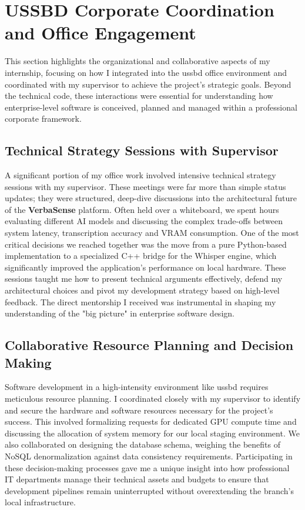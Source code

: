 \documentclass[oneside]{thesis-library}
\begin{document}
\section{USSBD Corporate Coordination and Office Engagement}
This section highlights the organizational and collaborative aspects of my internship, focusing on how I integrated into the \Gls{ussbd} office environment and coordinated with my supervisor to achieve the project's strategic goals. Beyond the technical code, these interactions were essential for understanding how enterprise-level software is conceived, planned and managed within a professional corporate framework.

\subsection{Technical Strategy Sessions with Supervisor}
A significant portion of my office work involved intensive technical strategy sessions with my supervisor. These meetings were far more than simple status updates; they were structured, deep-dive discussions into the architectural future of the \textbf{VerbaSense} platform. Often held over a whiteboard, we spent hours evaluating different AI models and discussing the complex trade-offs between system latency, transcription accuracy and VRAM consumption. One of the most critical decisions we reached together was the move from a pure Python-based implementation to a specialized C++ bridge for the Whisper engine, which significantly improved the application's performance on local hardware. These sessions taught me how to present technical arguments effectively, defend my architectural choices and pivot my development strategy based on high-level feedback. The direct mentorship I received was instrumental in shaping my understanding of the "big picture" in enterprise software design.

\subsection{Collaborative Resource Planning and Decision Making}
Software development in a high-intensity environment like \Gls{ussbd} requires meticulous resource planning. I coordinated closely with my supervisor to identify and secure the hardware and software resources necessary for the project's success. This involved formalizing requests for dedicated GPU compute time and discussing the allocation of system memory for our local staging environment. We also collaborated on designing the database schema, weighing the benefits of NoSQL denormalization against data consistency requirements. Participating in these decision-making processes gave me a unique insight into how professional IT departments manage their technical assets and budgets to ensure that development pipelines remain uninterrupted without overextending the branch's local infrastructure.
\end{document}
